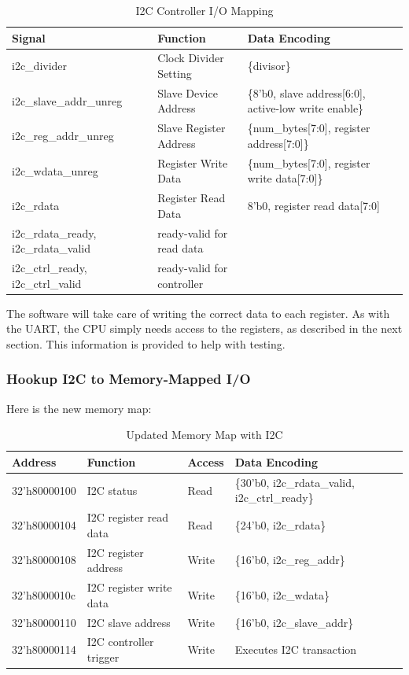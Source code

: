 \documentclass[11pt]{article}
\begin{document}
\begin{table}[hbt]
	\begin{center}
		\caption{I2C Controller I/O Mapping}
		\label{i2c_ctrl}
		\begin{tabular}{l l l}
			\toprule
			\textbf{Signal} & \textbf{Function} & \textbf{Data Encoding}\\
			\midrule
			i2c\_divider & Clock Divider Setting & \{divisor\} \\
			i2c\_slave\_addr\_unreg & Slave Device Address &  \{8'b0, slave address[6:0], active-low write enable\} \\
			i2c\_reg\_addr\_unreg & Slave Register Address & \{num\_bytes[7:0], register address[7:0]\} \\
			i2c\_wdata\_unreg & Register Write Data & \{num\_bytes[7:0], register write data[7:0]\} \\
			i2c\_rdata & Register Read Data & {8'b0, register read data[7:0]} \\
			i2c\_rdata\_ready, i2c\_rdata\_valid & ready-valid for read data &  \\
			i2c\_ctrl\_ready, i2c\_ctrl\_valid & ready-valid for controller 
		\end{tabular}
	\end{center}
\end{table}

The software will take care of writing the correct data to each register. As with the UART, the CPU simply needs access to the registers, as described in the next section. This information is provided to help with testing.

\subsubsection{Hookup I2C to Memory-Mapped I/O}

Here is the new memory map:
\begin{table}[H]
	\begin{center}
		\caption{Updated Memory Map with I2C}
		\label{i2c_mem_map}
		\begin{tabular}{l l l l}
			\toprule
			\textbf{Address} & \textbf{Function} & \textbf{Access} & \textbf{Data Encoding}\\
			\midrule
			32'h80000100 & I2C status & Read & \{30'b0, i2c\_rdata\_valid, i2c\_ctrl\_ready\} \\
			32'h80000104 & I2C register read data  & Read & \{24'b0, i2c\_rdata\} \\
			32'h80000108 & I2C register address & Write & \{16'b0, i2c\_reg\_addr\} \\
			32'h8000010c & I2C register write data & Write & \{16'b0, i2c\_wdata\} \\
			32'h80000110 & I2C slave address & Write & \{16'b0, i2c\_slave\_addr\} \\
			32'h80000114 & I2C controller trigger & Write & Executes I2C transaction
		\end{tabular}
	\end{center}
\end{table}
\end{document}
